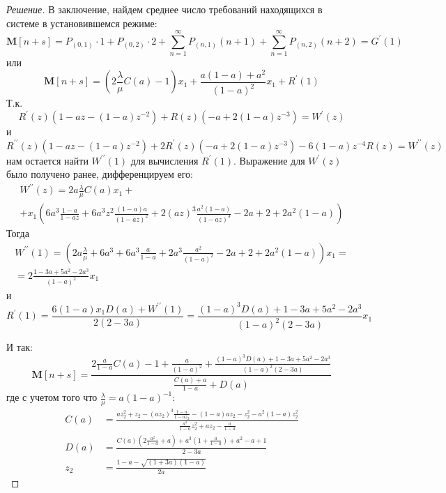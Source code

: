 \documentclass[12pt,a4paper]{article}
\newcommand{\mean}[1]{\mathbf{M}[#1]}
\begin{document}
\begin{proof}[Решение]
	В заключение, найдем среднее число требований находящихся в системе в установившемся режиме:
	\begin{equation*}
		\mean{n + s} = P_{(0, 1)} \cdot 1 + P_{(0, 2)} \cdot 2 + \sum_{n=1}^{\infty}{P_{(n, 1)} (n + 1)} + \sum_{n=1}^{\infty}{P_{(n, 2)} (n+2)} = G^\prime (1)
	\end{equation*}
	или
	\begin{equation*}
		\mean{n + s} = \left(2 \frac{\lambda}{\mu} C(a) - 1\right)x_1 + \frac{a (1 - a) + a^2}{(1-a)^2} x_1 + R^\prime (1)
	\end{equation*}
	Т.к.
	\begin{equation*}
		R^\prime (z) \left(1 - az - (1-a)z^{-2}\right) + R(z) \left(-a + 2(1-a)z^{-3}\right) = W^\prime (z)
	\end{equation*}
	и 
	\begin{equation*}
		R^{\prime\prime} (z) \left(1 - az - (1-a)z^{-2}\right) + 2R^\prime (z) \left(-a + 2(1-a)z^{-3}\right) - 6(1-a)z^{-4} R(z) = W^{\prime\prime} (z)
	\end{equation*}
	нам остается найти $W^{\prime\prime} (1)$ для вычисления $R^\prime (1)$. Выражение для $W^\prime (z)$ было получено ранее, дифференцируем его:
	\begin{multline*}
		W^{\prime\prime} (z) = 2 a \frac{\lambda}{\mu} C(a) x_1 + \\
		+ x_1 \left(6a^3 \frac{1-a}{1-az} + 6a^3 z^2 \frac{(1-a)a}{(1-az)^2} + 2(az)^3 \frac{a^2 (1-a)}{(1-az)^3} - 2a + 2 + 2a^2 (1 - a)\right) 
	\end{multline*}
	Тогда
	\begin{multline*}
		W^{\prime\prime}(1) = \left(2a\frac{\lambda}{\mu} + 6a^3 + 6a^3 \frac{a}{1-a} + 2a^3 \frac{a^2}{(1-a)^2} - 2a + 2 + 2a^2 (1-a)\right)x_1 = \\
		= 2 \frac{1 - 3a + 5a^2 - 2a^3}{(1-a)^2} x_1
	\end{multline*}
	и 
	\begin{equation}\label{eq:R}
		R^\prime (1) = \frac{6 (1-a) x_1 D(a) + W^{\prime\prime} (1)}{2\left(2 - 3a\right)} = \frac{(1-a)^3 D(a) + 1 - 3a + 5a^2 - 2a^3}{(1-a)^2(2 - 3a)} x_1
	\end{equation}
	
	И так:
	\begin{equation}\label{eq:mean}
		\mean{n + s} = \frac{2 \frac{a}{1-a} C(a) - 1 + \frac{a}{(1-a)^2} + \frac{(1-a)^3 D(a) + 1 - 3a + 5a^2 - 2a^3}{(1-a)^2(2 - 3a)}}{\frac{C(a) + a}{1-a} + D(a)}
	\end{equation}
	где с учетом того что $\frac{\lambda}{\mu} = a (1-a)^{-1}$:
	\begin{align*}
		C(a) &= \frac{az_2^2 + z_2 - (az_2)^3 \tfrac{1-a}{1-az_2} - (1-a)az_2 - z_2^2 - a^2 (1-a)z_2^2}{\frac{a^2}{1-a} z_2^2 + a z_2 - \frac{a}{1-a}} \\
		D(a) &= \frac{C(a)\left(2\frac{a^2}{1-a} + a\right) + a^3 \left(1 + \frac{a}{1-a}\right) + a^2 - a +1}{2 - 3a} \\
		z_2 &= \frac{1 - a - \sqrt{(1+3a)(1-a)}}{2a}
	\end{align*}
	

\end{proof}
\end{document}

